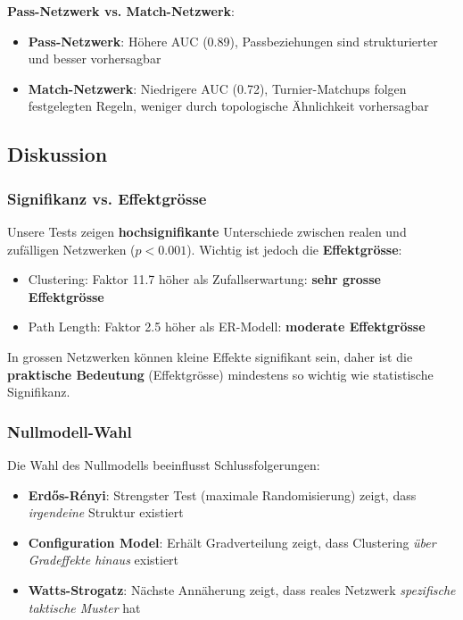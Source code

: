 \textbf{Pass-Netzwerk vs. Match-Netzwerk}:
\begin{itemize}
  \item \textbf{Pass-Netzwerk}: Höhere AUC (0.89), Passbeziehungen sind strukturierter und besser vorhersagbar
  \item \textbf{Match-Netzwerk}: Niedrigere AUC (0.72), Turnier-Matchups folgen festgelegten Regeln, weniger durch topologische Ähnlichkeit vorhersagbar
\end{itemize}

\subsection{Diskussion}

\subsubsection{Signifikanz vs. Effektgrösse}

Unsere Tests zeigen \textbf{hochsignifikante} Unterschiede zwischen realen und zufälligen Netzwerken ($p < 0.001$). Wichtig ist jedoch die \textbf{Effektgrösse}:

\begin{itemize}
  \item Clustering: Faktor 11.7 höher als Zufallserwartung: \textbf{sehr grosse Effektgrösse}
  \item Path Length: Faktor 2.5 höher als ER-Modell: \textbf{moderate Effektgrösse}
\end{itemize}

In grossen Netzwerken können kleine Effekte signifikant sein, daher ist die \textbf{praktische Bedeutung} (Effektgrösse) mindestens so wichtig wie statistische Signifikanz.

\subsubsection{Nullmodell-Wahl}

Die Wahl des Nullmodells beeinflusst Schlussfolgerungen:

\begin{itemize}
  \item \textbf{Erdős-Rényi}: Strengster Test (maximale Randomisierung) zeigt, dass \textit{irgendeine} Struktur existiert
  \item \textbf{Configuration Model}: Erhält Gradverteilung zeigt, dass Clustering \textit{über Gradeffekte hinaus} existiert
  \item \textbf{Watts-Strogatz}: Nächste Annäherung zeigt, dass reales Netzwerk \textit{spezifische taktische Muster} hat
\end{itemize}

